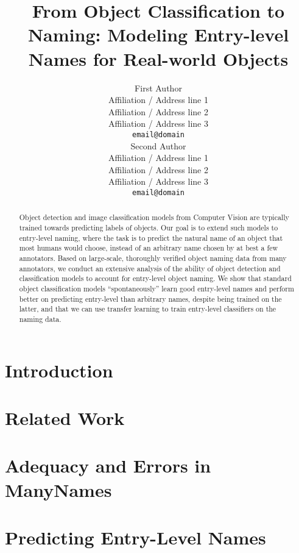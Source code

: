 \documentclass[11pt,a4paper]{article}
\title{From Object Classification to Naming: Modeling Entry-level Names for Real-world Objects}
\author{First Author \\
  Affiliation / Address line 1 \\
  Affiliation / Address line 2 \\
  Affiliation / Address line 3 \\
  \texttt{email@domain} \\\And
  Second Author \\
  Affiliation / Address line 1 \\
  Affiliation / Address line 2 \\
  Affiliation / Address line 3 \\
  \texttt{email@domain} \\}
\date{}
\newcommand{\cs}[1]{\textcolor{green!60!black}{\emph{//cs: #1//}}}
\newcommand{\mn}{ManyNames\xspace}
\newcommand{\arbitrary}{arbitrary\xspace}
\begin{document}
\maketitle
\begin{abstract}
Object detection and image classification models from Computer Vision are typically trained towards predicting labels of objects. 
Our goal is to extend such models to entry-level naming, where the task is to predict the natural name of an object that most humans would choose, instead of an \arbitrary name chosen by at best a few annotators. 
Based on large-scale, thoroughly verified object naming data from many annotators, we conduct an extensive analysis of the ability of object detection and classification models to account for entry-level object naming.
We show that standard object classification models ``spontaneously'' learn good entry-level names and perform better
on predicting entry-level than \arbitrary names, despite being trained on the latter, and that we can use transfer learning to train entry-level classifiers on the naming data. 
\end{abstract}

\section{Introduction}
\label{sec:intro}


\section{Related Work}
\label{sec:related}


\section{Adequacy and Errors in ManyNames}
\label{sec:manynames}


\section{Predicting Entry-Level Names}
\label{sec:experiments}

\end{document}
